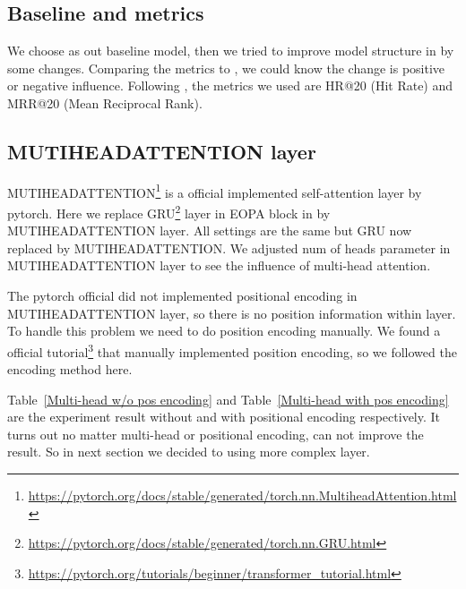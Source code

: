 \documentclass{article}
\begin{document}
\subsection{Baseline and metrics}

We choose \cite{chen2020lessr} as out baseline model,
then we tried to improve model structure in \cite{chen2020lessr} by some changes.
Comparing the metrics to \cite{chen2020lessr},
we could know the change is positive or negative influence.
Following \cite{chen2020lessr},
the metrics we used are HR@20 (Hit Rate) and MRR@20 (Mean Reciprocal Rank).

\subsection{MUTIHEADATTENTION layer}

MUTIHEADATTENTION\footnote{\url{https://pytorch.org/docs/stable/generated/torch.nn.MultiheadAttention.html}}
is a official implemented self-attention layer by pytorch.
Here we replace GRU\footnote{\url{https://pytorch.org/docs/stable/generated/torch.nn.GRU.html}}
layer in EOPA block in \cite{chen2020lessr} by MUTIHEADATTENTION layer.
All settings are the same but GRU now replaced by MUTIHEADATTENTION.
We adjusted num of heads parameter in MUTIHEADATTENTION layer
to see the influence of multi-head attention.

The pytorch official did not implemented positional encoding in
MUTIHEADATTENTION layer, so there is no position information within layer.
To handle this problem we need to do position encoding manually.
We found a official tutorial\footnote{\url{https://pytorch.org/tutorials/beginner/transformer_tutorial.html}}
that manually implemented position encoding,
so we followed the encoding method here.

Table~\ref{Multi-head w/o pos encoding} and Table~\ref{Multi-head with pos encoding}
are the experiment result without and with positional encoding respectively.
It turns out no matter multi-head or positional encoding, can not improve the result.
So in next section we decided to using more complex layer.
\end{document}
